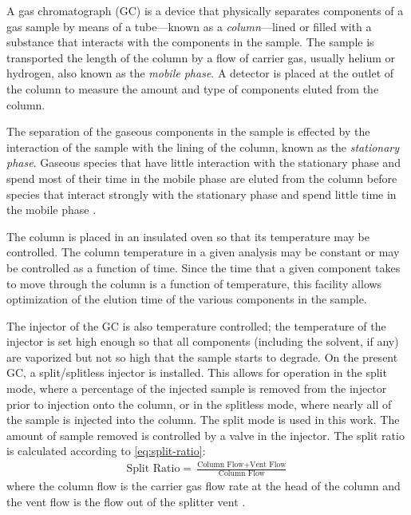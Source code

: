 \documentclass[../main.tex]{subfiles}
\begin{document}
A gas chromatograph (GC) is a device that physically separates components
of a gas sample by means of a tube---known as a \textit{column}---lined or filled
with a substance that interacts with the components in the sample. The sample
is transported the length of the column by a flow of carrier gas, usually
helium or hydrogen, also known as the \textit{mobile phase}. A detector is
placed at the outlet of the column to measure the amount and type
of components eluted from the column.

The separation of the gaseous components in the sample is effected by
the interaction of the sample with the lining of the column, known as the
\textit{stationary phase}. Gaseous species that have little interaction with
the stationary phase and spend most of their time in the mobile phase
are eluted from the column before species that interact strongly with
the stationary phase and spend little time in the mobile phase \cite{Sparkman2011a}.

The column is placed in an insulated oven so that its temperature may be
controlled. The column temperature in a given analysis may be constant
or may be controlled as a function of time. Since the time that a given
component takes to move through the column is a function of temperature,
this facility allows optimization of the elution time of the various
components in the sample.

The injector of the GC is also temperature controlled; the temperature of
the injector is set high enough so that all components (including the solvent,
if any) are vaporized but not so high that the sample starts to degrade. On the present GC,
a split/splitless injector is installed. This allows for operation in the
split mode, where a percentage of the injected sample is removed from the
injector prior to injection onto the column, or in the splitless mode,
where nearly all of the sample is injected into the column. The split mode
is used in this work. The amount of sample removed is controlled by a valve
in the injector. The split ratio is calculated according to \cref{eq:split-ratio}:
%
\begin{gather}
\label{eq:split-ratio}
\text{Split Ratio} = \frac{\text{Column Flow} +\text{Vent Flow}}{\text{Column Flow}}
\end{gather}
%
where the column flow is the carrier gas flow rate at the head of the column
and the vent flow is the flow out of the splitter vent \cite{Sparkman2011a}.
\end{document}
